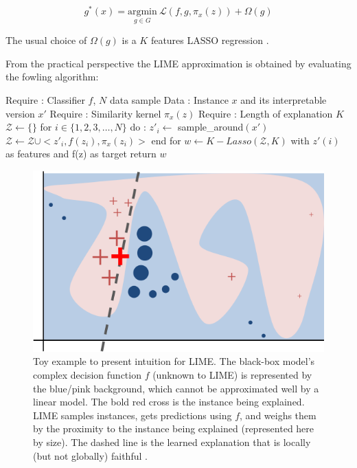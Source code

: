 \begin{equation} \label{eq:LIME}
    g^*(x) = \underset{{g \in G}}{\mathrm{argmin}} ~ \mathcal{L}(f,g,\pi_x(z)) + \Omega(g)
\end{equation}

The usual choice of $\Omega(g)$ is a $K$ features LASSO regression \cite{LASSO}. 


From the practical perspective the LIME approximation is obtained by evaluating the fowling algorithm:


\begin{algorithm}[caption={Model explanation using LIME}, label={alg:LIME}]
Require : Classifier $f$, $N$ data sample
Data :  Instance $x$ and its interpretable version $x'$
Require : Similarity kernel $\pi_x(z)$
Require :  Length of explanation $K$
$\mathcal{Z} \leftarrow \{\}$
for  $i \in \{ 1, 2, 3, \ldots, N \}$ do : 
   $z'_{i} \leftarrow$ sample_around$(x')$
   $\mathcal{Z}  \leftarrow  \mathcal{Z} \cup  < z'_i, f(z_i),\pi_x(z_i) > $ 
   end for
$w \leftarrow  K-Lasso(\mathcal{Z}, K)$ with $z'(i)$ as features and f(z) as target
return $w$
\end{algorithm}



\begin{figure}
\centering
\includegraphics[scale=0.7]{figures/lime.png}
\caption{Toy example to present intuition for LIME. The black-box model's complex decision function $f$ (unknown to LIME) is represented by the blue/pink background, which cannot be approximated well by a linear model. The bold red cross is the instance
being explained. LIME samples instances, gets predictions using $f$, and weighs them by the proximity to the instance being explained (represented here by size). The dashed line is the learned explanation that is locally (but not globally) faithful \cite{lime}. 
\label{fig:lime}}
\end{figure} 


